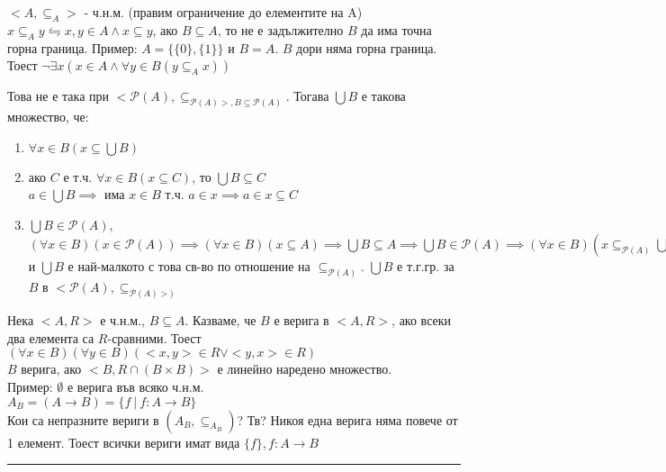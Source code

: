 \documentclass[fleqn, titlepage, 12pt]{report}
\begin{document}
$<A, \subseteq_A>$ - ч.н.м. (правим ограничение до елементите на A)\\
$x \subseteq_A y \leftrightharpoons x,y \in A \land x \subseteq y$, ако $B \subseteq A$, то не е задължително $B$
да има точна горна граница.
\bigbreak
Пример: $A = \{ \{ 0 \}, \{ 1 \} \}$ и $B = A$. $B$ дори няма горна граница.\\
Тоест $\lnot \exists{x}(x \in A \land \forall{y} \in B (y \subseteq_A x))$
\bigbreak

Това не е така при $<\mathcal{P}(A), \subseteq_{\mathcal{P}(A)>, B \subseteq \mathcal{P}(A)}$.
Тогава $\bigcup B$ е такова множество, че:
\begin{enumerate}
  \item $\forall{x \in B}(x \subseteq \bigcup B)$
  \item ако $C$ е т.ч. $\forall{x \in B}(x \subseteq C)$, то $\bigcup B \subseteq C$\\
    $a \in \bigcup B \implies$ има $x \in B$ т.ч. $a \in x \implies a \in x \subseteq C$
  \item $\bigcup B \in \mathcal{P}(A)$,
    $(\forall{x \in B})(x \in \mathcal{P}(A))  \implies (\forall{x \in B})(x \subseteq A)
    \implies \bigcup B \subseteq A \implies \bigcup B \in \mathcal{P}(A)
    \implies (\forall{x \in B})(x \subseteq_{\mathcal{P}(A)} \bigcup B)$ и $\bigcup B$ е най-малкото с това св-во
    по отношение на $\subseteq_{\mathcal{P}(A)}$. $\bigcup B$ е т.г.гр. за $B$
    в $<\mathcal{P}(A), \subseteq_{\mathcal{P}(A)>)}$
\end{enumerate}
\bigbreak

 Нека $<A,R>$ е ч.н.м., $B \subseteq A$.
Казваме, че $B$ е верига в $<A,R>$, ако всеки два елемента са $R$-сравними.
Тоест $(\forall{x \in B})(\forall{y \in B})(<x,y> \in R \lor <y,x> \in R)$\\
$B$  верига, ако $<B,R \cap (B \times  B)>$ е линейно наредено множество.\\
Пример: $\emptyset$ е верига във всяко ч.н.м.\\
$A_B = (A \rightarrow B) = \{f\ |\ f: A \rightarrow B\}$\\
Кои са непразните вериги в $(A_B, \subseteq_{A_B})$?
Тв? Никоя една верига няма повече от 1 елемент. Тоест всички вериги имат вида $\{ f \}, f: A \rightarrow B$
\bigbreak
\hrule
\bigbreak
\end{document}
